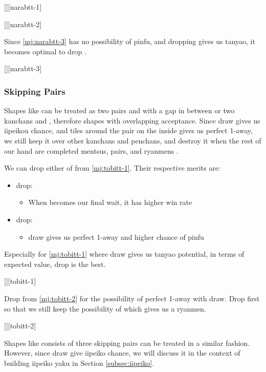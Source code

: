 \documentclass[12pt]{article}
\begin{document}
[][narabtt-1]

[][narabtt-2]

Since \ref{mj:narabtt-3} has no possibility of pinfu, and dropping  gives us tanyao, it becomes optimal to drop .

[][narabtt-3]


\subsubsection*{Skipping Pairs}

Shapes like  can be treated as two pairs  and  with a gap in between or two kanchans  and , therefore shapes with overlapping acceptance. Since  draw gives us iipeikou chance, and tiles around the pair on the inside gives us perfect 1-away, we still keep it over other kanchans and penchans, and destroy it when the rest of our hand are completed mentsus, pairs, and ryanmens \citep[][pp. 114--117]{uzaku-haikouritsu}.

We can drop either of  from \ref{mj:tobitt-1}. Their respective merits are:

\begin{itemize}
  \item {} drop:
  \begin{itemize}
    \item When  becomes our final wait, it has higher win rate
  \end{itemize}
  \item {} drop:
  \begin{itemize}
    \item {} draw gives us perfect 1-away and higher chance of pinfu
  \end{itemize}
\end{itemize}

Especially for \ref{mj:tobitt-1} where  draw gives us tanyao potential, in terms of expected value,  drop is the best.

[][tobitt-1]

Drop  from \ref{mj:tobitt-2} for the possibility of perfect 1-away with  draw. Drop  first so that we still keep the possibility of  which gives us a ryanmen.

[][tobitt-2]

Shapes like  consists of three skipping pairs can be treated in a similar fashion. However, since  draw give iipeiko chance, we will discuss it in the context of building iipeiko yaku in Section \ref{subsec:iipeiko}.
\end{document}
